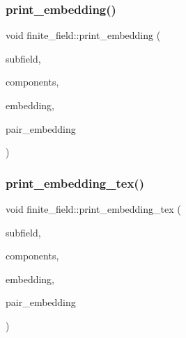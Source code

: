 \subsubsection{\texorpdfstring{print\+\_\+embedding()}{print\_embedding()}}
{\footnotesize\ttfamily void finite\+\_\+field\+::print\+\_\+embedding (\begin{DoxyParamCaption}\item[{\mbox{\hyperlink{classfinite__field}{finite\+\_\+field}} \&}]{subfield,  }\item[{\mbox{\hyperlink{galois_8h_a09fddde158a3a20bd2dcadb609de11dc}{I\+NT}} $\ast$}]{components,  }\item[{\mbox{\hyperlink{galois_8h_a09fddde158a3a20bd2dcadb609de11dc}{I\+NT}} $\ast$}]{embedding,  }\item[{\mbox{\hyperlink{galois_8h_a09fddde158a3a20bd2dcadb609de11dc}{I\+NT}} $\ast$}]{pair\+\_\+embedding }\end{DoxyParamCaption})}

\mbox{\label{classfinite__field_add368646c7d9f72fab0910e6328f4afd}} 
\subsubsection{\texorpdfstring{print\+\_\+embedding\+\_\+tex()}{print\_embedding\_tex()}}
{\footnotesize\ttfamily void finite\+\_\+field\+::print\+\_\+embedding\+\_\+tex (\begin{DoxyParamCaption}\item[{\mbox{\hyperlink{classfinite__field}{finite\+\_\+field}} \&}]{subfield,  }\item[{\mbox{\hyperlink{galois_8h_a09fddde158a3a20bd2dcadb609de11dc}{I\+NT}} $\ast$}]{components,  }\item[{\mbox{\hyperlink{galois_8h_a09fddde158a3a20bd2dcadb609de11dc}{I\+NT}} $\ast$}]{embedding,  }\item[{\mbox{\hyperlink{galois_8h_a09fddde158a3a20bd2dcadb609de11dc}{I\+NT}} $\ast$}]{pair\+\_\+embedding }\end{DoxyParamCaption})}

\mbox{\label{classfinite__field_a63e6335651a240d50fa79c5d1debbf21}} 
